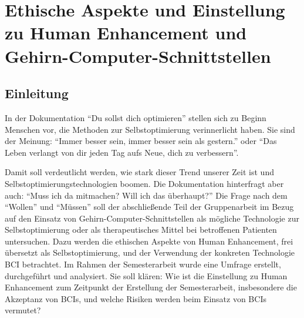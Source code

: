 \documentclass[11pt,ngerman,parskip=half]{scrartcl}
\begin{document}
\section{Ethische Aspekte und Einstellung zu Human Enhancement und Gehirn-Computer-Schnittstellen}
\label{sec:kathrin}
\subsection{Einleitung}
\label{subsec:kathrin_einleitung}
In der Dokumentation \enquote{Du sollst dich optimieren} stellen sich zu
Beginn Menschen vor, die Methoden zur Selbstoptimierung verinnerlicht haben.
Sie sind der Meinung: \enquote{Immer besser sein, immer besser sein als
gestern.} oder \enquote{Das Leben verlangt von dir jeden Tag aufs Neue, dich
zu verbessern}. \parencite[][Min. 0--1]{dettmer-finke_du_2017}

Damit soll verdeutlicht werden, wie stark dieser Trend unserer Zeit ist und
Selbstoptimierungstechnologien boomen.
\parencite[vgl.][]{defi-filmproduktion_text_2018} Die Dokumentation
hinterfragt aber auch: \enquote{Muss ich da mitmachen? Will ich das
überhaupt?} \parencite[][Min. 1--2]{dettmer-finke_du_2017} Die Frage nach dem
\enquote{Wollen} und \enquote{Müssen} soll der abschließende Teil der
Gruppenarbeit im Bezug auf den Einsatz von Gehirn-Computer-Schnittstellen als
mögliche Technologie zur Selbstoptimierung oder als therapeutisches Mittel
bei betroffenen Patienten untersuchen. Dazu werden die ethischen Aspekte von
Human Enhancement, frei übersetzt als Selbstoptimierung, und der Verwendung
der konkreten Technologie BCI betrachtet. Im Rahmen der Semesterarbeit wurde
eine Umfrage erstellt, durchgeführt und analysiert. Sie soll klären: Wie ist
die Einstellung zu Human Enhancement zum Zeitpunkt der Erstellung der
Semesterarbeit, insbesondere die Akzeptanz von BCIs, und welche Risiken
werden beim Einsatz von BCIs vermutet?
\end{document}
